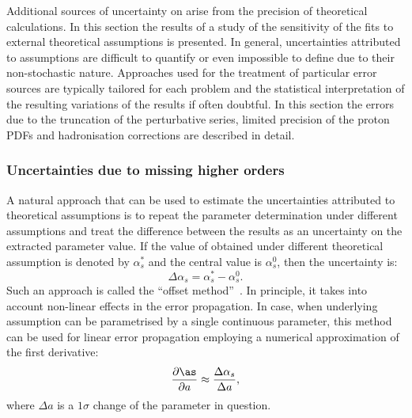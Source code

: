 Additional sources of uncertainty on \as arise from the precision of theoretical calculations. In this section the results of a study of the sensitivity of the \asz fits to external theoretical assumptions is presented. In general, uncertainties attributed to assumptions are difficult to quantify or even impossible to define due to their non-stochastic nature. Approaches used for the treatment of particular error sources are typically tailored for each problem and the statistical interpretation of the resulting variations of the results if often doubtful. In this section the errors due to the truncation of the perturbative series, limited precision of the proton PDFs and hadronisation corrections are described in detail.

\subsubsection{Uncertainties due to missing higher orders}
\label{subsec:asscalevar}
A natural approach that can be used to estimate the uncertainties attributed to theoretical assumptions is to repeat the parameter determination under different assumptions and treat the difference between the results as an uncertainty on the extracted parameter value. If the value of \asz obtained under different theoretical assumption is denoted by $\alpha_s^{\ast}$ and the central value is $\alpha_s^0$, then the uncertainty is:
\begin{equation}
 \Delta\alpha_s = \alpha_s^{\ast} - \alpha_s^0.
\end{equation}
Such an approach is called the ``offset method''~\cite{Cooper:2010}. In principle, it takes into account non-linear effects in the error propagation. In case, when underlying assumption can be parametrised by a single continuous parameter, this method can be used for linear error propagation employing a numerical approximation of the first derivative:
\begin{equation}
 \frac{\partial \as}{ \partial a} \approx \frac{\Delta\alpha_s}{\Delta a},
\end{equation}
where $\Delta a$ is a $1\sigma$ change of the parameter in question.

